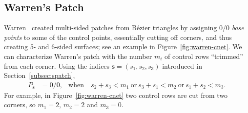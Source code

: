\documentclass[9pt,academicons]{article}
\begin{document}
\subsection{Warren's Patch}
\label{subsec:warren}
Warren~\cite{Warren:1992} created multi-sided patches from B\'ezier triangles by assigning $0/0$
\emph{base points} to some of the control points, essentially cutting off corners, and thus
creating 5- and 6-sided surfaces; see an example in Figure~\ref{fig:warren-cnet}.
We can characterize Warren's patch with the number $m_i$ of control rows
``trimmed'' from each corner. Using the indices $\mathbf{s}=(s_1,s_2,s_3)$
introduced in Section~\ref{subsec:spatch},
\begin{equation}
  \begin{aligned}
    P_\mathbf{s}&=0/0, & \mathrm{when}\ &
    s_2+s_3<m_1\ \mathrm{or}\ s_3+s_1<m_2\ \mathrm{or}\ s_1+s_2<m_3.
  \end{aligned}
\end{equation}
For example, in Figure~\ref{fig:warren-cnet} two control rows are cut from two corners,
so $m_1=2$, $m_2=2$ and $m_3=0$.
\end{document}
